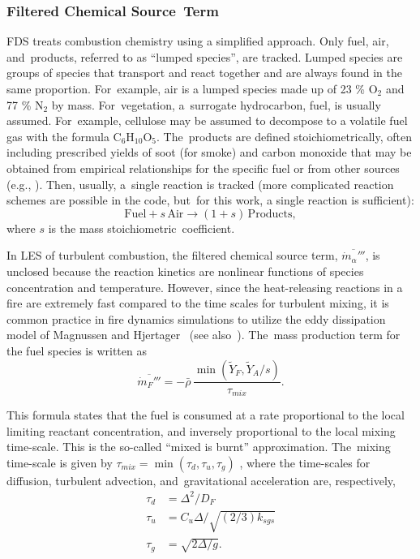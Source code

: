 \documentclass[atmosphere,article,accept,moreauthors,pdftex]{Definitions/mdpi}
\renewcommand{\C}{\mathrm{C}}
\renewcommand{\H}{\mathrm{H}}
\renewcommand{\O}{\mathrm{O}}
\begin{document}
\subsubsection{Filtered Chemical Source~Term}

FDS treats combustion chemistry using a simplified approach.  Only fuel, air, and~products, referred to as ``lumped species'', are tracked.  Lumped species are groups of species that transport and react together and are always found in the same proportion.  For~example, air is a lumped species made up of 23 \% O$_2$ and 77 \% N$_2$ by mass.  For~vegetation, a~surrogate hydrocarbon, fuel, is usually assumed.  For~example, cellulose may be assumed to decompose to a volatile fuel gas with the formula $\C_{6} \H_{10} \O_{5}$.  The~products are defined stoichiometrically, often including prescribed yields of soot (for smoke) and carbon monoxide that may be obtained from empirical relationships for the specific fuel or from other sources (e.g., \cite{SFPE:Mulholland}).  Then, usually, a~single reaction is tracked (more complicated reaction schemes are possible in the code, but~for this work, a single reaction is sufficient):
\begin{equation}
\mathrm{Fuel} + s \, \mathrm{Air} \rightarrow (1+s) \,\mathrm{Products},
\end{equation}
where $s$ is the mass stoichiometric~coefficient.  

In LES of turbulent combustion, the filtered chemical source term, $\overline{\dot{m}_\alpha'''}$, is unclosed because the reaction kinetics are nonlinear functions of species concentration and temperature.  However, since the heat-releasing reactions in a fire are extremely fast compared to the time scales for turbulent mixing, it is common practice in fire dynamics simulations to utilize the eddy dissipation model of Magnussen and Hjertager~\cite{Magnussen:1} (see also~\cite{Poinsot:TNC}).  The~mass production term for the fuel species is written as
\begin{equation}
\overline{\dot{m}_{F}'''} = -\bar{\rho} \,\frac{\min(\tilde{Y}_F,\tilde{Y}_A/s)}{\tau_{mix}}.
\end{equation}

This formula states that the fuel is consumed at a rate proportional to the local limiting reactant concentration, and inversely proportional to the local mixing time-scale.  This is the so-called ``mixed is burnt'' approximation.  The~mixing time-scale is given by $\tau_{mix} = \min(\tau_d, \tau_u,\tau_g)$ \cite{McDermott:2011}, where the time-scales for diffusion, turbulent advection, and~gravitational acceleration are, respectively,
\begin{align}
\tau_d &= \Delta^2/D_F \\
\tau_u &= C_u \Delta / \sqrt{(2/3)k_{sgs}} \\
\tau_g &= \sqrt{2\Delta/g}.
\end{align}
\end{document}
